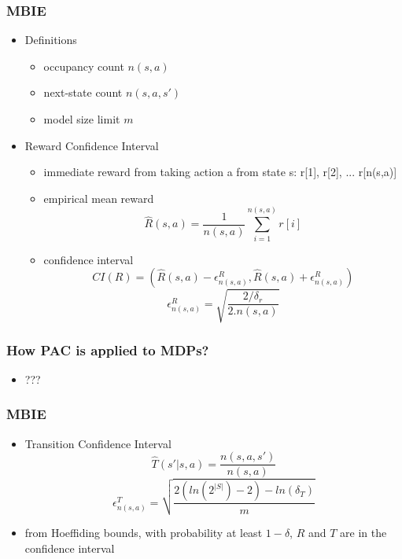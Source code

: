 \documentclass{beamer}
\begin{document}

\begin{frame}
	\frametitle{MBIE}
	\begin{itemize}
		\item Definitions
		\begin{itemize}
			\item occupancy count $n(s,a)$
			\item next-state count $n(s,a,s')$
			\item model size limit $m$
		\end{itemize}
		\item Reward Confidence Interval
		\begin{itemize}
			\item immediate reward from taking action a from state s: \newline r[1], r[2], ... r[n(s,a)]
			\item empirical mean reward
			$$ \hat{R}(s,a) = \frac{1}{n(s,a)} \sum_{i=1}^{n(s,a)} r[i] $$
			\item confidence interval
			$$ CI(R) = (\hat{R}(s,a)-\epsilon_{n(s,a)}^R , \hat{R}(s,a)+\epsilon_{n(s,a)}^R) $$
			$$ \epsilon_{n(s,a)}^R = \sqrt{\frac{2/\delta_r}{2.n(s,a)}} $$
		
		\end{itemize}
	\end{itemize}
\end{frame}

\begin{frame}
	\frametitle{How PAC is applied to MDPs?}
	\begin{itemize}
		\item ???
	\end{itemize}
\end{frame}

\begin{frame}
	\frametitle{MBIE}
	\begin{itemize}
		\item Transition Confidence Interval
		$$ \hat{T}(s'|s,a) = \frac{n(s,a,s')}{n(s,a)} $$
		$$ \epsilon_{n(s,a)}^T = \sqrt{\frac{2(ln(2^{|S|}) - 2) - ln(\delta_T)}{m}} $$
		\item from Hoeffiding bounds, with probability at least $1-\delta$, $R$ and $T$ are in the confidence interval
	\end{itemize}
\end{frame}
\end{document}
